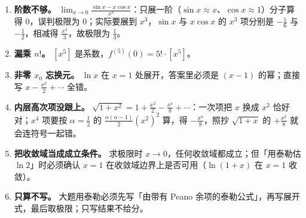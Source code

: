 \documentclass[11pt,UTF8]{ctexart}
\begin{document}
\begin{warnbox}[改卷时最常扣分的地方]
\begin{enumerate}[leftmargin=1.7em,itemsep=2pt]
\item \textbf{阶数不够。} $\lim_{x\to0}\frac{\sin x-x\cos x}{x^{3}}$：只展一阶（$\sin x\approx x$、$\cos x\approx1$）分子算得 $0$，误判极限为 $0$；实际要展到 $x^{3}$，$\sin x$ 与 $x\cos x$ 的 $x^{3}$ 项分别是 $-\frac{1}{6}$ 与 $-\frac{1}{2}$，相减得 $\frac{x^{3}}{3}$，故极限为 $\frac{1}{3}$。
\item \textbf{漏乘 $n!$。} $[x^{5}]$ 是系数，$f^{(5)}(0)=5!\cdot[x^{5}]$。
\item \textbf{非零 $x_0$ 忘换元。} $\ln x$ 在 $x=1$ 处展开，答案里必须是 $(x-1)$ 的幂；直接写 $x-\frac{x^{2}}{2}+\cdots$ 全错。
\item \textbf{内层高次项没跟上。} $\sqrt{1+x^{2}}=1+\frac{x^{2}}{2}-\frac{x^{4}}{8}+\cdots$：一次项把 $x$ 换成 $x^{2}$ 恰好对；$x^{4}$ 项要按 $\alpha=\frac{1}{2}$ 的 $\frac{\alpha(\alpha-1)}{2}(x^{2})^{2}$ 算，得 $-\frac{x^{4}}{8}$，照抄 $\sqrt{1+x}$ 的 $+\frac{x^{2}}{8}$ 就会连符号一起错。
\item \textbf{把收敛域当成成立条件。} 求极限时 $x\to0$，任何收敛域都成立；但「用泰勒估 $\ln2$」时必须确认 $x=1$ 在收敛域边界上是否可用（$\ln(1+x)$ 在 $x=1$ 收敛）。
\item \textbf{只算不写。} 大题用泰勒必须先写「由带有 Peano 余项的泰勒公式」，再写展开式，最后取极限；只写结果不给分。
\end{enumerate}
\end{warnbox}

\end{document}
